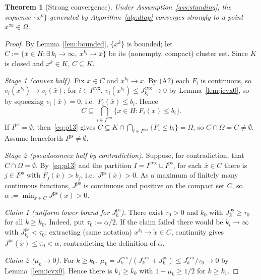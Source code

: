 \documentclass[]{interact}
\theoremstyle{plain}
\newtheorem{theorem}{Theorem}[section]
\theoremstyle{definition}
\theoremstyle{remark}
\newcommand{\cvx}{\mathrm{cvx}}
\newcommand{\ps}{\mathrm{ps}}
\begin{document}
\begin{theorem}[Strong convergence]\label{thm:strong}
Under Assumption~\ref{ass:standing}, the sequence $\{x^k\}$ generated by
Algorithm~\ref{alg:dtap} converges strongly to a point $x^\infty\in\Omega$.
\end{theorem}
\begin{proof}
By Lemma~\ref{lem:bounded}, $\{x^k\}$ is bounded; let
$C:=\{\bar x\in H:\exists\,k_l\to\infty,\ x^{k_l}\to\bar x\}$ be its (nonempty, compact)
cluster set. Since $K$ is closed and $x^k\in K$, $C\subseteq K$.

\emph{Stage 1 (convex half).} Fix $\bar x\in C$ and $x^{k_l}\to\bar x$. By (A2) each
$F_i$ is continuous, so $v_i(x^{k_l})\to v_i(\bar x)$; for $i\in I^{\cvx}$,
$v_i(x^{k_l})\le J^{\cvx}_{k_l}\to0$ by Lemma~\ref{lem:jcvx0}, so by squeezing
$v_i(\bar x)=0$, i.e.\ $F_i(\bar x)\le b_i$. Hence
\begin{equation}\label{eq:p13}
C\subseteq\bigcap_{i\in I^{\cvx}}\{x\in H:F_i(x)\le b_i\}.
\end{equation}
If $I^{\ps}=\emptyset$, then~\eqref{eq:p13} gives
$C\subseteq K\cap\bigcap_{i\in I^{\cvx}}\{F_i\le b_i\}=\Omega$, so $C\cap\Omega=C\ne\emptyset$.
Assume henceforth $I^{\ps}\ne\emptyset$.

\emph{Stage 2 (pseudoconvex half by contradiction).} Suppose, for contradiction, that
$C\cap\Omega=\emptyset$. By~\eqref{eq:p13} and the partition $I=I^{\cvx}\cup I^{\ps}$, for
each $\bar x\in C$ there is $j\in I^{\ps}$ with $F_j(\bar x)>b_j$, i.e.\
$J^{\ps}(\bar x)>0$. As a maximum of finitely many continuous functions, $J^{\ps}$ is
continuous and positive on the compact set $C$, so $\alpha:=\min_{x\in C}J^{\ps}(x)>0$.

\smallskip
\emph{Claim 1 (uniform lower bound for $J^{\ps}_k$).} There exist $\tau_0>0$ and $k_0$
with $J^{\ps}_k\ge\tau_0$ for all $k\ge k_0$. Indeed, put $\tau_0:=\alpha/2$. If the claim
failed there would be $k_l\to\infty$ with $J^{\ps}_{k_l}<\tau_0$; extracting (same
notation) $x^{k_l}\to\tilde x\in C$, continuity gives $J^{\ps}(\tilde x)\le\tau_0<\alpha$,
contradicting the definition of $\alpha$.

\smallskip
\emph{Claim 2 ($\mu_k\to0$).} For $k\ge k_0$,
$\mu_k=J^{\cvx}_k/(J^{\cvx}_k+J^{\ps}_k)\le J^{\cvx}_k/\tau_0\to0$ by
Lemma~\ref{lem:jcvx0}. Hence there is $k_1\ge k_0$ with $1-\mu_k\ge1/2$ for $k\ge k_1$.


\end{proof}
\end{document}
